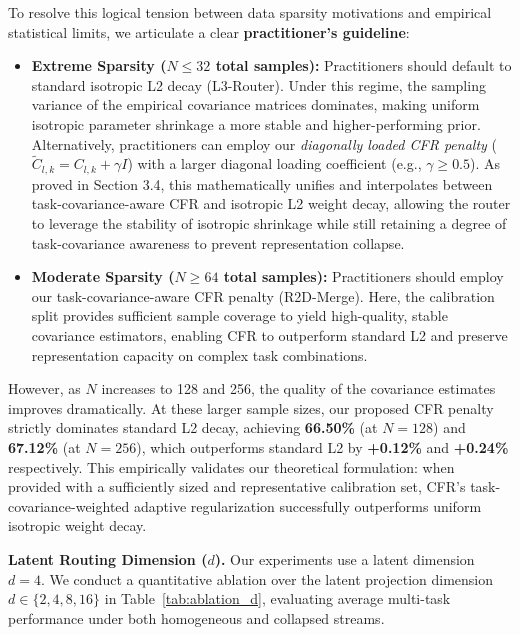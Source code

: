 To resolve this logical tension between data sparsity motivations and empirical statistical limits, we articulate a clear \textbf{practitioner's guideline}:
\begin{itemize}
    \item \textbf{Extreme Sparsity ($N \le 32$ total samples):} Practitioners should default to standard isotropic L2 decay (L3-Router). Under this regime, the sampling variance of the empirical covariance matrices dominates, making uniform isotropic parameter shrinkage a more stable and higher-performing prior. Alternatively, practitioners can employ our \emph{diagonally loaded CFR penalty} ($\tilde{C}_{l, k} = C_{l, k} + \gamma I$) with a larger diagonal loading coefficient (e.g., $\gamma \geq 0.5$). As proved in Section 3.4, this mathematically unifies and interpolates between task-covariance-aware CFR and isotropic L2 weight decay, allowing the router to leverage the stability of isotropic shrinkage while still retaining a degree of task-covariance awareness to prevent representation collapse.
    \item \textbf{Moderate Sparsity ($N \ge 64$ total samples):} Practitioners should employ our task-covariance-aware CFR penalty (R2D-Merge). Here, the calibration split provides sufficient sample coverage to yield high-quality, stable covariance estimators, enabling CFR to outperform standard L2 and preserve representation capacity on complex task combinations.
\end{itemize}

However, as $N$ increases to 128 and 256, the quality of the covariance estimates improves dramatically. At these larger sample sizes, our proposed CFR penalty strictly dominates standard L2 decay, achieving \textbf{66.50\%} (at $N=128$) and \textbf{67.12\%} (at $N=256$), which outperforms standard L2 by \textbf{+0.12\%} and \textbf{+0.24\%} respectively. This empirically validates our theoretical formulation: when provided with a sufficiently sized and representative calibration set, CFR's task-covariance-weighted adaptive regularization successfully outperforms uniform isotropic weight decay.

\textbf{Latent Routing Dimension ($d$).} Our experiments use a latent dimension $d=4$. We conduct a quantitative ablation over the latent projection dimension $d \in \{2, 4, 8, 16\}$ in Table~\ref{tab:ablation_d}, evaluating average multi-task performance under both homogeneous and collapsed streams.


